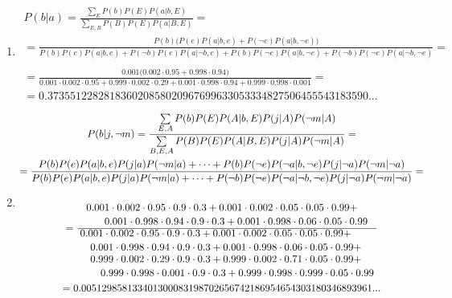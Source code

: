 \documentclass[12pt]{article}
\begin{document}
\begin{enumerate}
        \item
            \begin{multline*}
                P(b|a) = \frac{\sum\limits_E P(b)P(E)P(a|b,E)}{\sum\limits_{E,B}P(B)P(E)P(a|B,E)} =\\
                = \frac{P(b)\Big( P(e)P(a|b,e) + P(\neg e)P(a|b,\neg e) \Big)}{P(b)P(e)P(a|b,e)+P(\neg b)P(e)P(a|\neg b, e) + P(b)P(\neg e)P(a|b,\neg e) + P(\neg b)P(\neg e)P(a|\neg b,\neg e)} = \\ \\
                = \frac{0.001\Big( 0.002\cdot 0.95 + 0.998\cdot 0.94\Big)}{0.001\cdot 0.002\cdot 0.95 + 0.999\cdot 0.002\cdot 0.29 + 0.001\cdot 0.998\cdot 0.94 + 0.999\cdot 0.998\cdot 0.001} = \\
                = 0.373551228281836020858020967699633053334827506455543183590...
            \end{multline*}

        \item 
            \begin{multline*}
                P(b|j,\neg m) = \frac{\sum\limits_{E,A} P(b)P(E)P(A|b,E)P(j|A)P(\neg m|A)}{\sum\limits_{B,E,A}P(B)P(E)P(A|B,E)P(j|A)P(\neg m|A)} = \\
                = \frac{P(b)P(e)P(a|b,e)P(j|a)P(\neg m|a)+\cdots +P(b)P(\neg e)P(\neg a|b,\neg e)P(j|\neg a)P(\neg m|\neg a)}{P(b)P(e)P(a|b,e)P(j|a)P(\neg m|a) +\cdots + P(\neg b)P(\neg e)P(\neg a|\neg b, \neg e)P(j|\neg a)P(\neg m|\neg a)} = \\ \\
                = \frac{\splitdfrac{0.001\cdot 0.002\cdot 0.95\cdot 0.9\cdot 0.3 + 0.001\cdot 0.002\cdot 0.05\cdot 0.05\cdot 0.99 +}{0.001\cdot 0.998\cdot 0.94\cdot 0.9\cdot 0.3 + 0.001\cdot 0.998\cdot 0.06\cdot 0.05\cdot 0.99}}{\splitdfrac{\splitdfrac{0.001\cdot 0.002\cdot 0.95\cdot 0.9\cdot 0.3 + 0.001\cdot 0.002\cdot 0.05\cdot 0.05\cdot 0.99 +}{0.001\cdot 0.998\cdot 0.94\cdot 0.9\cdot 0.3 + 0.001\cdot 0.998\cdot 0.06\cdot 0.05\cdot 0.99 +}}{\splitdfrac{0.999\cdot 0.002\cdot 0.29\cdot 0.9\cdot 0.3 + 0.999\cdot 0.002\cdot 0.71\cdot 0.05\cdot 0.99 +}{0.999\cdot 0.998\cdot 0.001\cdot 0.9\cdot 0.3 + 0.999\cdot 0.998\cdot 0.999\cdot 0.05\cdot 0.99}}} \\
                = 0.005129858133401300083198702656742186954654303180346893961...
            \end{multline*}
    \end{enumerate}
\end{document}
